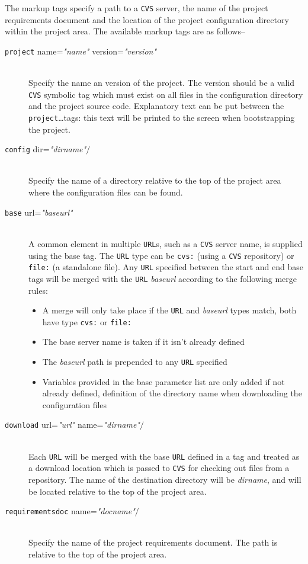 \ni The markup tags specify a path to a \texttt{CVS} server, the name of the
project requirements document and the location of the project
configuration directory within the project area.  The available markup
tags are as follows--
\begin{description}
\item[\lbkt\texttt{project} name=\textit{"name"} version=\textit{"version"}\rbkt~]\mbox{}\\
  Specify the name an version of the project. The version should be a
  valid \texttt{CVS} symbolic tag which must exist on all files in the
  configuration directory and the project source code. Explanatory
  text can be put between the \lbkt\texttt{project}\dots\rbkt tags: this
  text will be printed to the screen when bootstrapping the project.
\item[\lbkt\texttt{config} dir=\textit{"dirname"}$/$\rbkt]\mbox{}\\
  Specify the name of a directory relative to the top of the project
  area where the configuration files can be found.
\item[\lbkt\texttt{base} url=\textit{"baseurl"}\rbkt~]\mbox{}\\
  A common element in multiple \texttt{URL}s, such as a \texttt{CVS} server name, is
  supplied using the base tag. The \texttt{URL} type can be \texttt{cvs:}
  (using a \texttt{CVS} repository) or \texttt{file:} (a standalone file). Any
  \texttt{URL} specified between the start and end base tags will be merged
  with the \texttt{URL} \textit{baseurl} according to the following merge
  rules:
  \begin{itemize}
  \item A merge will only take place if the \texttt{URL} and \textit{baseurl}
    types match, \eg both have type \texttt{cvs:} or \texttt{file:}
  \item The base server name is taken if it isn't already defined
  \item The \textit{baseurl} path is prepended to any \texttt{URL} specified
  \item Variables provided in the base parameter list are only added
    if not already defined, \eg definition of the directory name when
    downloading the configuration files
  \end{itemize}
\item[\lbkt\texttt{download} url=\textit{"url"} name=\textit{"dirname"}$/$\rbkt]\mbox{}\\
  Each \texttt{URL} will be merged with the base \texttt{URL} defined in a
   tag and treated as a download location which is
  passed to \texttt{CVS} for checking out files from a repository. The name of
  the destination directory will be \textit{dirname}, and will be
  located relative to the top of the project area.
\item[\lbkt\texttt{requirementsdoc} name=\textit{"docname"}$/$\rbkt]\mbox{}\\
  Specify the name of the project requirements document. The path is
  relative to the top of the project area.
\end{description}

